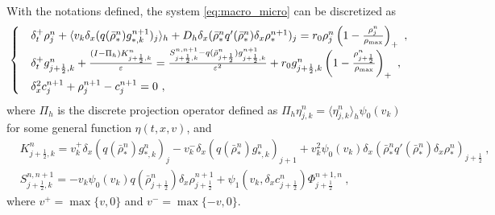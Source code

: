 \documentclass[review,onefignum,onetabnum]{siamart220329}
\begin{document}
With the notations defined, the system  \cref{eq:macro_micro} can be discretized as 
\begin{align}
\label{eq:scheme}
    \begin{cases}
    & \delta_t^+ \rho_j^n +  
    \langle v_k\delta_x(q(\bar{\rho}_*^n) g_{*,k}^{n+1})_j\rangle_h
     + D_h \delta_x(\bar{\rho}_*^n q'(\bar{\rho}_*^n)\delta_x \rho_*^{n+1})_j 
    = r_0 \rho_j^{n}\left(1 - \frac{\rho_j^n}{\rho_{\rm max}}\right)_+\ ,\\
    &\delta_t^+ g_{j+\frac12,k}^n + \frac{(I-\Pi_h) K_{j+\frac12,k}^n}{\varepsilon} 
    = \frac{S_{j+\frac12,k}^{n, n+1}-q(\bar{\rho}_{j+\frac12}^n) g_{j+\frac12,k}^{n+1}}{\varepsilon^2} + r_0 g_{j+\frac12,k}^n\left(1 - \frac{\rho_{j+\frac12}^n}{\rho_{\rm max}}\right)_+\ ,\\
    & \delta_x^2 c_j^{n+1} + \rho_j^{n+1} - c_j^{n+1}=0\ ,
\end{cases}
\end{align}
where  $\Pi_h$ is the discrete projection operator defined as 
$\Pi_h \eta_{j,k}^n = \langle\eta_{j,k}^n\rangle_h \psi_{0}(v_k)$ for some general function $\eta(t,x,v)$, and 
\begin{align*}
    & K_{j+\frac12,k}^n = v_k^+\delta_x(q(\bar{\rho}_*^n) g_{*,k}^n)_j - v_k^-\delta_x(q(\bar{\rho}_*^n) g_{*,k}^n)_{j+1}
    + v_k^2\psi_{0}(v_k)\delta_x(\bar{\rho}_*^n q'(\bar{\rho}_*^n)\delta_x\rho_*^n)_{j+\frac12}\ , \\
    & S_{j+\frac12,k}^{n, n+1} = -v_k\psi_{0}(v_k)q(\bar{\rho}_{j+\frac12}^n)  \delta_x \rho_{j+\frac12}^{n+1} + \psi_{1}(v_k, \delta_x c_{j+\frac12}^n)
    \Phi^{n+1,n}_{j+\frac12}\ ,
\end{align*}
where $v^+ = \max\{v, 0 \}$ and $v^- = \max\{-v, 0\}$.
\end{document}
